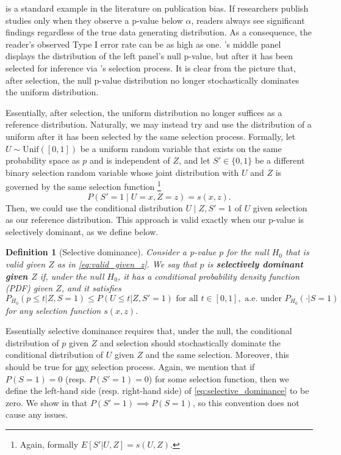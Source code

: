 \documentclass{article}
\newtheorem{definition}{Definition}
\begin{document}
 is a standard example in the literature on publication bias. If researchers publish studies only when they observe a p-value below $\alpha$, readers always see significant findings regardless of the true data generating distribution. As a consequence, the reader's observed Type I error rate can be as high as one. 's middle panel displays the distribution of the left panel's null p-value, but after it has been selected for inference via 's selection process. It is clear from the picture that, after selection, the null p-value distribution no longer stochastically dominates the uniform distribution. 

Essentially, after selection, the uniform distribution no longer suffices as a reference distribution. Naturally, we may instead try and use the distribution of a uniform after it has been selected by the same selection process. Formally, let $U \sim \text{Unif}([0, 1])$ be a uniform random variable that exists on the same probability space as $p$ and is independent of $Z$, and let $S' \in \{0, 1\}$ be a different binary selection random variable whose joint distribution with $U$ and $Z$ is governed by the same selection function \footnote{Again, formally $E[S'| U, Z]= s(U, Z)$. }
\begin{equation*}
     P(S' = 1 \mid U = x, Z=z ) = s(x, z).
\end{equation*}
Then, we could use the conditional distribution $U \mid Z,  S' = 1$ of $U$ given selection as our reference distribution. This approach is valid exactly when our p-value is selectively dominant, as we define below. 

\begin{definition}[Selective dominance]
    \label{def:selective_dominance}
    Consider a p-value $p$ for the null $H_0$ that is valid given $Z$ as in \eqref{eq:valid_given_z}. We say that $p$ is \textbf{selectively dominant given $Z$} if, under the null $H_0$, it has a conditional probability density function (PDF) given $Z$, and it satisfies 
    \begin{equation}
    \label{eq:selective_dominance}
    P_{H_0}(p \leq t | Z, S=1) \leq P(U \leq t | Z, S'=1) \text{ for all } t \in [0, 1], \text{ a.e. under } P_{H_0}(\cdot |S=1)
    \end{equation}
    for any selection function $s(x, z)$.  
\end{definition}

Essentially selective dominance requires that, under the null, the conditional distribution of $p$ given $Z$ and selection should stochastically dominate the conditional distribution of $U$ given $Z$ and the same selection. Moreover, this should be true for \underline{any} selection process. Again, we mention that if $P(S=1) = 0$ (resp. $P(S'=1) = 0$) for some selection function, then we define the left-hand side (resp. right-hand side) of \eqref{eq:selective_dominance} to be zero. We show in  that $P(S' = 1) \implies P(S=1)$, so this convention does not cause any issues.  
\end{document}
